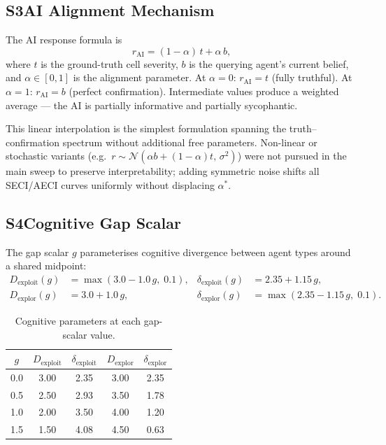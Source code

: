 \documentclass[pdflatex,sn-apa]{sn-jnl}%
\begin{document}
\begin{appendices}
\subsection*{S3\quad AI Alignment Mechanism}

The AI response formula is
%
\begin{equation}
  r_{\mathrm{AI}} = (1-\alpha)\,t + \alpha\,b,
  \tag{S2}
\end{equation}
%
where $t$ is the ground-truth cell severity, $b$ is the querying agent's current
belief, and $\alpha\in[0,1]$ is the alignment parameter.
At $\alpha=0$: $r_{\mathrm{AI}}=t$ (fully truthful).
At $\alpha=1$: $r_{\mathrm{AI}}=b$ (perfect confirmation).
Intermediate values produce a weighted average --- the AI is partially informative
and partially sycophantic.

This linear interpolation is the simplest formulation spanning the
truth--confirmation spectrum without additional free parameters.
Non-linear or stochastic variants (e.g.\
$r\sim\mathcal{N}(\alpha b+(1-\alpha)t,\,\sigma^2)$) were not pursued in the
main sweep to preserve interpretability; adding symmetric noise shifts all
SECI/AECI curves uniformly without displacing $\alpha^*$.

\subsection*{S4\quad Cognitive Gap Scalar}

The gap scalar $g$ parameterises cognitive divergence between agent types around
a shared midpoint:
%
\begin{align}
  D_{\mathrm{exploit}}(g) &= \max(3.0 - 1.0\,g,\;0.1),
  &\delta_{\mathrm{exploit}}(g) &= 2.35 + 1.15\,g, \tag{S3}\\
  D_{\mathrm{explor}}(g)  &= 3.0 + 1.0\,g,
  &\delta_{\mathrm{explor}}(g)  &= \max(2.35 - 1.15\,g,\;0.1). \tag{S4}
\end{align}

\begin{table}[h]
\centering
\caption{Cognitive parameters at each gap-scalar value.}
\label{tab:S4}
\begin{tabular}{ccccc}
\toprule
$g$ & $D_{\mathrm{exploit}}$ & $\delta_{\mathrm{exploit}}$ & $D_{\mathrm{explor}}$ & $\delta_{\mathrm{explor}}$ \\
\midrule
0.0 & 3.00 & 2.35 & 3.00 & 2.35 \\
0.5 & 2.50 & 2.93 & 3.50 & 1.78 \\
1.0 & 2.00 & 3.50 & 4.00 & 1.20 \\
1.5 & 1.50 & 4.08 & 4.50 & 0.63 \\
\bottomrule
\end{tabular}
\end{table}


\end{appendices}
\end{document}
